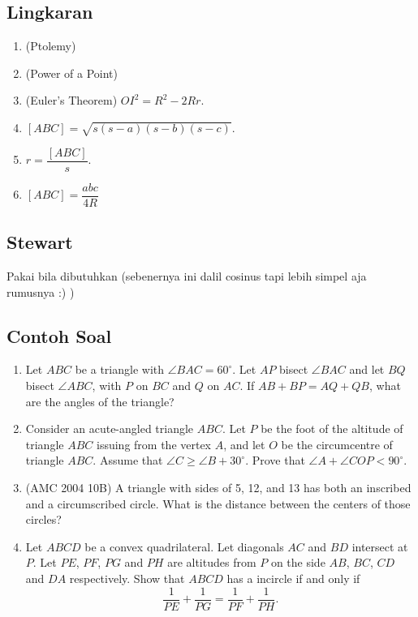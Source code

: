 \documentclass[11pt]{scrartcl}
\begin{document}
\subsection{Lingkaran}
\begin{enumerate}
    \item (Ptolemy)
    \item (Power of a Point)
    \item (Euler's Theorem) $OI^2=R^2-2Rr$.
    \item $[ABC]=\sqrt{s(s-a)(s-b)(s-c)}$.
    \item $r=\dfrac{[ABC]}{s}$.
    \item $[ABC]=\dfrac{abc}{4R}$
\end{enumerate}

\subsection{Stewart}
Pakai bila dibutuhkan (sebenernya ini dalil cosinus tapi lebih simpel aja rumusnya :) )

\subsection{Contoh Soal}
\begin{enumerate}
    \item Let $ABC$ be a triangle with $\angle BAC = 60^\circ$. Let $AP$ bisect $\angle BAC$ and let $BQ$ bisect $\angle ABC$, with $P$ on $BC$ and $Q$ on $AC$. If $AB + BP = AQ + QB$, what are the angles of the triangle?

    \item Consider an acute-angled triangle $ABC$. Let $P$ be the foot of the altitude of triangle $ABC$ issuing from the vertex $A$, and let $O$ be the circumcentre of triangle $ABC$. Assume that $\angle C \geq \angle B + 30^\circ$. Prove that $\angle A + \angle COP < 90^\circ$.

    \item (AMC 2004 10B) A triangle with sides of 5, 12, and 13 has both an inscribed and a circumscribed circle. What is the distance between the centers of those circles?

    \item Let $ABCD$ be a convex quadrilateral. Let diagonals $AC$ and $BD$ intersect at $P$. Let $PE$, $PF$, $PG$ and $PH$ are altitudes from $P$ on the side $AB$, $BC$, $CD$ and $DA$ respectively. Show that $ABCD$ has a incircle if and only if
    $$\dfrac{1}{PE}+\dfrac{1}{PG}=\dfrac{1}{PF}+\dfrac{1}{PH}.$$
\end{enumerate}
\end{document}
